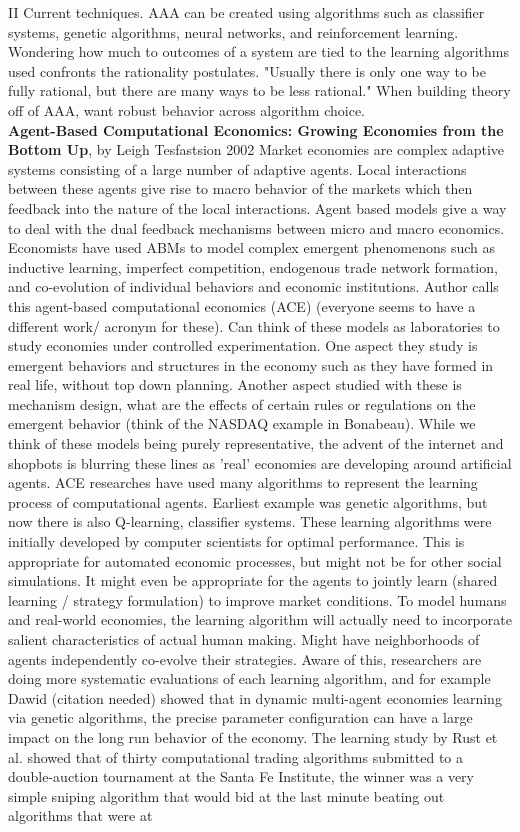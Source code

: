 \documentclass[12pt,twoside]{reedthesis}
\begin{document}
II Current techniques. AAA can be created using algorithms such as classifier systems, genetic algorithms, neural networks, and reinforcement learning. Wondering how much to outcomes of a system are tied to the learning algorithms used confronts the rationality postulates. "Usually there is only one way to be fully rational, but there are many ways to be less rational." When building theory off of AAA, want robust behavior across algorithm choice. \cite{Holland1991} \\

\textbf{Agent-Based Computational Economics: Growing Economies from the Bottom Up}, by Leigh Tesfastsion 2002
Market economies are complex adaptive systems consisting of a large number of adaptive agents. Local interactions between these agents give rise to macro behavior of the markets which then feedback into the nature of the local interactions. Agent based models give a way to deal with the dual feedback mechanisms between micro and macro economics. Economists have used ABMs to model complex emergent phenomenons such as inductive learning, imperfect competition, endogenous trade network formation, and co-evolution of individual behaviors and economic institutions. Author calls this agent-based computational economics (ACE) (everyone seems to have a different work/ acronym for these). Can think of these models as laboratories to study economies under controlled experimentation. One aspect they study is emergent behaviors and structures in the economy such as they have formed in real life, without top down planning. Another aspect studied with these is mechanism design, what are the effects of certain rules or regulations on the emergent behavior (think of the NASDAQ example in Bonabeau). While we think of these models being purely representative, the advent of the internet and shopbots is blurring these lines as 'real' economies are developing around artificial agents. ACE researches have used many algorithms to represent the learning process of computational agents. Earliest example was genetic algorithms, but now there is also Q-learning, classifier systems. These learning algorithms were initially developed by computer scientists for optimal performance. This is appropriate  for automated economic processes, but might not be for other social simulations. It might even be appropriate for the agents to jointly learn (shared learning / strategy formulation) to improve market conditions. To model humans and real-world economies, the learning algorithm will actually need to incorporate salient characteristics of actual human making. Might have neighborhoods of agents independently co-evolve their strategies. Aware of this, researchers are doing more systematic evaluations of each learning algorithm, and for example Dawid (citation needed) showed that in dynamic multi-agent economies learning via genetic algorithms, the precise parameter configuration can have a large impact on the long run behavior of the economy. The learning study by Rust et al. showed that of thirty computational trading algorithms submitted to a double-auction tournament at the Santa Fe Institute, the winner was a very simple sniping algorithm that would bid at the last minute beating out algorithms that were at 
\end{document}
